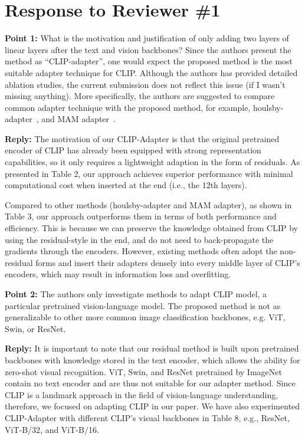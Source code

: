 \documentclass[default]{sn-jnl}%
\theoremstyle{thmstyleone}%
\theoremstyle{thmstyletwo}%
\theoremstyle{thmstylethree}%
\begin{document}
\section{Response to Reviewer \#1}
\label{sec:reviewer_1}

\textbf{Point 1:} What is the motivation and justification of only adding two layers of linear layers after the text and vision backbones? Since the authors present the method as ``CLIP-adapter'', one would expect the proposed method is the most suitable adapter technique for CLIP. Although the authors has provided detailed ablation studies, the current submission does not reflect this issue (if I wasn't missing anything). More specifically, the authors are suggested to compare common adapter technique with the proposed method, for example, houlsby-adapter~\cite{houlsby2019parameter}, and MAM adapter~\cite{he2022towards}.

\noindent \textbf{Reply:} The motivation of our CLIP-Adapter is that the original pretrained encoder of CLIP has already been equipped with strong representation capabilities, so it only requires a lightweight adaption in the form of residuals. As presented in Table 2, our approach achieves superior performance with minimal computational cost when inserted at the end (i.e., the 12th layers).

Compared to other methods (houlsby-adapter and MAM adapter), as shown in Table 3, our approach outperforms them in terms of both performance and efficiency. This is because we can preserve the knowledge obtained from CLIP by using the residual-style in the end, and do not need to back-propagate the gradients through the encoders.
However, existing methods often adopt the non-residual forms and insert their adapters densely into every middle layer of CLIP's encoders, which may result in information loss and overfitting.

\vspace{5pt}
\noindent \textbf{Point 2:} The authors only investigate methods to adapt CLIP model, a particular pretrained vision-language model. The proposed method is not as generalizable to other more common image classification backbones, e.g. ViT, Swin, or ResNet.

\noindent \textbf{Reply:} It is important to note that our residual method is built upon pretrained backbones with knowledge stored in the text encoder, which allows the ability for zero-shot visual recognition. ViT, Swin, and ResNet pretrained by ImageNet contain no text encoder and are thus not suitable for our adapter method.
Since CLIP is a landmark approach in the field of vision-language understanding, therefore, we focused on adapting CLIP in our paper. We have also experimented CLIP-Adapter with different CLIP's visual backbones in Table 8, e.g., ResNet, ViT-B/32, and ViT-B/16.
\end{document}
